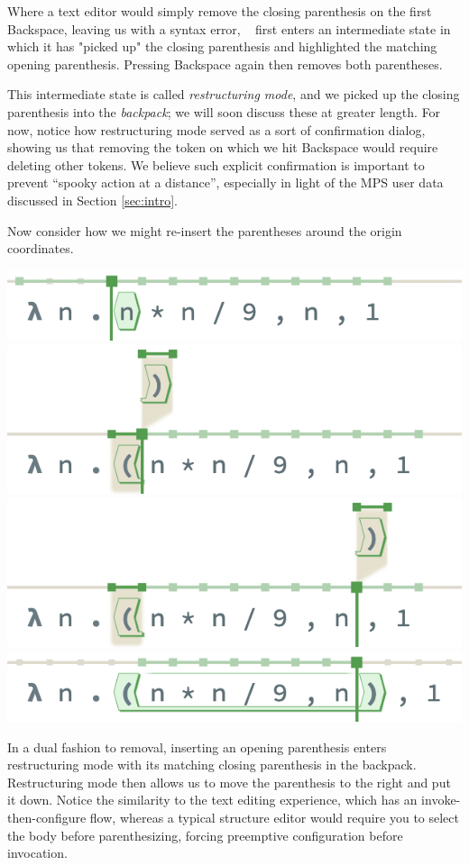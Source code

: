 Where a text editor would simply remove the closing parenthesis
on the first Backspace, leaving us with a syntax error,
\tylr~ first enters an intermediate state in which it has
"picked up" the closing parenthesis and highlighted the
matching opening parenthesis.
Pressing Backspace again then removes both parentheses.

This intermediate state is called \emph{restructuring mode},
and we picked up the closing parenthesis into the \emph{backpack};
we will soon discuss these at greater length.
For now, notice how restructuring mode served as a
sort of confirmation dialog, showing us that removing
the token on which we hit Backspace would require
deleting other tokens.
We believe such explicit confirmation is important to
prevent ``spooky action at a distance'', especially
in light of the MPS user data discussed in Section \ref{sec:intro}.

Now consider how we might re-insert the parentheses
around the origin coordinates.

\begin{center}
  \includegraphics[width=0.65\columnwidth]{img/insert-nonleaf-0.png}
  \includegraphics[width=0.65\columnwidth]{img/insert-nonleaf-1.png}
  \includegraphics[width=0.65\columnwidth]{img/insert-nonleaf-2.png}
  \includegraphics[width=0.65\columnwidth]{img/insert-nonleaf-3.png}
\end{center}

\noindent
In a dual fashion to removal, inserting
an opening parenthesis enters restructuring mode with its
matching closing parenthesis in the backpack.
Restructuring mode then allows us to move the parenthesis
to the right and put it down.
Notice the similarity to the text editing experience,
which has an invoke-then-configure flow, whereas a typical
structure editor would require you to select the body before
parenthesizing, forcing preemptive configuration before
invocation.

